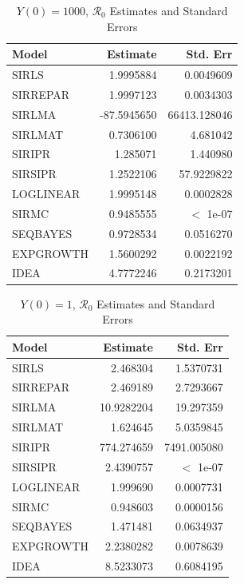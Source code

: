 \documentclass[12pt]{article}
\newcommand{\rr}{\ensuremath{\mathcal{R}_0}}
\begin{document}
\begin{table}[H]
	
	\centering
	\begin{tabular}[t]{l|r|r}
		\hline
		Model & Estimate & Std. Err\\
		\hline
		SIRLS & 1.9995884 & 0.0049609\\
		\hline
		SIRREPAR & 1.9997123 & 0.0034303\\
		\hline
		SIRLMA & -87.5945650 & 66413.128046\\
		\hline
		SIRLMAT & 0.7306100 & 4.681042\\
		\hline
		SIRIPR & 1.285071 & 1.440980\\
		\hline
		SIRSIPR & 1.2522106 & 57.9229822 \\
		\hline
		LOGLINEAR & 1.9995148 & 0.0002828\\
		\hline
		SIRMC & 0.9485555 & $<$ 1e-07\\
		\hline
		SEQBAYES & 0.9728534 & 0.0516270\\
		\hline
		EXPGROWTH & 1.5600292 & 0.0022192\\
		\hline
		IDEA & 4.7772246 & 0.2173201\\
		\hline
	\end{tabular}
        \caption{$Y(0) = 1000$, $\rr$ Estimates and Standard Errors}\label{tab:inits-res1}
\end{table}

\begin{table}[H]
	
	\centering
	\begin{tabular}[t]{l|r|r}
		\hline
		Model & Estimate & Std. Err\\
		\hline
		SIRLS & 2.468304 & 1.5370731\\
		\hline
		SIRREPAR & 2.469189 & 2.7293667\\
		\hline
		SIRLMA & 10.9282204 & 19.297359 \\
		\hline
		SIRLMAT & 1.624645 & 5.0359845\\
		\hline
		SIRIPR & 774.274659 & 7491.005080 \\
		\hline
		SIRSIPR & 2.4390757 & $<$ 1e-07 \\
		\hline
		LOGLINEAR & 1.999690 & 0.0007731\\
		\hline
		SIRMC & 0.948603 & 0.0000156\\
		\hline
		SEQBAYES & 1.471481 & 0.0634937\\
		\hline
		EXPGROWTH & 2.2380282 & 0.0078639\\
		\hline
		IDEA & 8.5233073 & 0.6084195\\
		\hline
	\end{tabular}
        \caption{$Y(0) = 1$, $\rr$ Estimates and Standard Errors}\label{tab:inits-res2}
\end{table}
\end{document}
